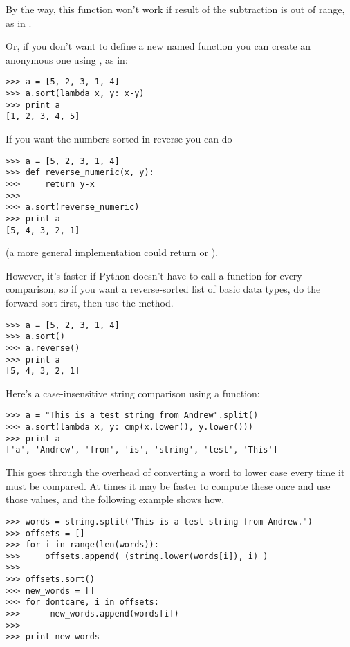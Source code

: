 \documentclass{howto}
\begin{document}
By the way, this function won't work if result of the subtraction
is out of range, as in .

Or, if you don't want to define a new named function you can create an
anonymous one using , as in:

\begin{verbatim}
>>> a = [5, 2, 3, 1, 4]
>>> a.sort(lambda x, y: x-y)
>>> print a
[1, 2, 3, 4, 5]
\end{verbatim}

If you want the numbers sorted in reverse you can do

\begin{verbatim}
>>> a = [5, 2, 3, 1, 4]
>>> def reverse_numeric(x, y):
>>>     return y-x
>>> 
>>> a.sort(reverse_numeric)
>>> print a
[5, 4, 3, 2, 1]
\end{verbatim}

(a more general implementation could return  or ).

However, it's faster if Python doesn't have to call a function for
every comparison, so if you want a reverse-sorted list of basic data
types, do the forward sort first, then use the  method.

\begin{verbatim}
>>> a = [5, 2, 3, 1, 4]
>>> a.sort()
>>> a.reverse()
>>> print a
[5, 4, 3, 2, 1]
\end{verbatim}

Here's a case-insensitive string comparison using a  function:

\begin{verbatim}
>>> a = "This is a test string from Andrew".split()
>>> a.sort(lambda x, y: cmp(x.lower(), y.lower()))
>>> print a
['a', 'Andrew', 'from', 'is', 'string', 'test', 'This']
\end{verbatim}

This goes through the overhead of converting a word to lower case
every time it must be compared.  At times it may be faster to compute
these once and use those values, and the following example shows how.

\begin{verbatim}
>>> words = string.split("This is a test string from Andrew.")
>>> offsets = []
>>> for i in range(len(words)):
>>>     offsets.append( (string.lower(words[i]), i) )
>>> 
>>> offsets.sort()
>>> new_words = []
>>> for dontcare, i in offsets:
>>>      new_words.append(words[i])
>>> 
>>> print new_words
\end{verbatim}
\end{document}
